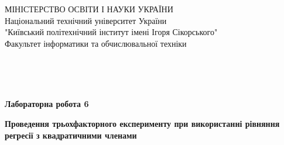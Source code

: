 \begin{titlepage}
     \begin{center}
      {\selectfont МІНІСТЕРСТВО ОСВІТИ І НАУКИ УКРАЇНИ} \\
      Національний технічний університет України
      \\ "Київський політехнічний інститут імені Ігоря Сікорського"
      \\ Факультет інформатики та обчислювальної техніки
     \end{center}  

    $\;$
    
    $\;$
    
    $\;$
    
    $\;$
    
    $\;$
    
    \vspace{0.5cm}
    \begin{center}
     {\large\textbf{Лабораторна робота 6}\par}
     \vspace{0.5cm}
     \textbf{Проведення трьохфакторного експерименту при використанні рівняння регресії з квадратичними членами}
    \end{center}
    \vspace{2.5cm}


\end{titlepage}
